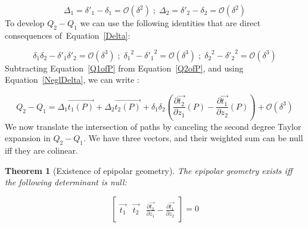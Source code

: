 \documentclass{ipol}
\newcommand{\BigV}[1]{\ensuremath{\overrightarrow{#1}}}
\newcommand{\TanO}[1]{\BigV{t_1#1}}
\newcommand{\TanT}[1]{\BigV{t_2#1}}
\newcommand{\Negl}[1]{\ensuremath{\mathcal{O}(#1)}}
\newcommand{\DerPart}[2]{\frac{\partial #1}{\partial #2}}
\newtheorem{theorem}{Theorem}
\begin{document}
\begin{equation}
   \Delta_1 =   \delta'_1 -\delta_1 = \Negl{\delta^2}  \; ; \; \Delta_2 =   \delta'_2 -\delta_2 = \Negl{\delta^2}
   \label{Delta}
\end{equation}
%
To develop $ Q_2 -Q_1$ we can use the following identities  that are direct consequences of~Equation~\eqref{Delta}:

\begin{equation}
   \delta_1  \delta_2 -  \delta'_1  \delta'_2  = \Negl{\delta^3} \;;\;
   {\delta_1}^2 - {\delta'_1}^2 =  \Negl{\delta^3} \;;\;
   {\delta_2}^2 - {\delta'_2}^2 =  \Negl{\delta^3} 
   \label{NeglDelta}
\end{equation}
%
Subtracting Equation~\eqref{Q1ofP} from Equation~\eqref{Q2ofP}, and using Equation~\eqref{NeglDelta}, we can write :

\begin{equation}
    Q_2 -Q_1 =   \Delta_1 \TanO{(P)} +   \Delta_2 \TanT{(P)}  
               + \delta_1  \delta_2(\DerPart { \TanT{}}{z_1}(P)  -\DerPart { \TanO{}}{z_2}(P) )
               + \Negl{\delta^3}
\end{equation}
%
We now translate the intersection of paths by canceling the second degree Taylor expansion in $Q_2 -Q_1$. We have three vectors, and their weighted sum can be null iff they are colinear.

\begin{theorem}[Existence of epipolar geometry]
The epipolar geometry exists iff the following determinant is null:

\begin{equation}
\left[ \begin{array}{c|c|c}
\TanO{} & \TanT{}  & \DerPart { \TanT{}}{z_1}  -\DerPart { \TanO{}}{z_2}  
\end{array} \right]  
=0
\end{equation}

\end{theorem}
\end{document}
